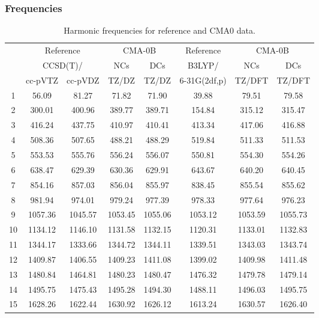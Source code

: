\documentclass[10pt,oneside]{article}
\begin{document}
\subsubsection*{Frequencies}
\begin{table}[h!]
\centering
\caption{Harmonic frequencies for reference and CMA0 data.}
\begin{tabular}{cccccccc}
\toprule
{} & \multicolumn{2}{c}{Reference} & \multicolumn{2}{c}{CMA-0B} &    Reference & \multicolumn{2}{c}{CMA-0B} \\
{} & \multicolumn{2}{c}{CCSD(T)/} &     NCs &     DCs &       B3LYP/ &     NCs &     DCs \\
{} &   cc-pVTZ & cc-pVDZ &   TZ/DZ &   TZ/DZ & 6-31G(2df,p) &  TZ/DFT &  TZ/DFT \\
\midrule
1  &     56.09 &   81.27 &   71.82 &   71.90 &        39.88 &   79.51 &   79.58 \\
2  &    300.01 &  400.96 &  389.77 &  389.71 &       154.84 &  315.12 &  315.47 \\
3  &    416.24 &  437.75 &  410.97 &  410.41 &       413.34 &  417.06 &  416.88 \\
4  &    508.36 &  507.65 &  488.21 &  488.29 &       519.84 &  511.33 &  511.53 \\
5  &    553.53 &  555.76 &  556.24 &  556.07 &       550.81 &  554.30 &  554.26 \\
6  &    638.47 &  629.39 &  630.36 &  629.91 &       643.67 &  640.20 &  640.45 \\
7  &    854.16 &  857.03 &  856.04 &  855.97 &       838.45 &  855.54 &  855.62 \\
8  &    981.94 &  974.01 &  979.24 &  977.39 &       978.33 &  977.64 &  976.23 \\
9  &   1057.36 & 1045.57 & 1053.45 & 1055.06 &      1053.12 & 1053.59 & 1055.73 \\
10 &   1134.12 & 1146.10 & 1131.58 & 1132.15 &      1120.31 & 1133.01 & 1132.83 \\
11 &   1344.17 & 1333.66 & 1344.72 & 1344.11 &      1339.51 & 1343.03 & 1343.74 \\
12 &   1409.87 & 1406.55 & 1409.23 & 1411.08 &      1399.02 & 1409.98 & 1411.48 \\
13 &   1480.84 & 1464.81 & 1480.23 & 1480.47 &      1476.32 & 1479.78 & 1479.14 \\
14 &   1495.75 & 1475.43 & 1495.28 & 1494.30 &      1488.11 & 1496.03 & 1495.75 \\
15 &   1628.26 & 1622.44 & 1630.92 & 1626.12 &      1613.24 & 1630.57 & 1626.40 \\

\end{tabular}
\end{table}
\end{document}
